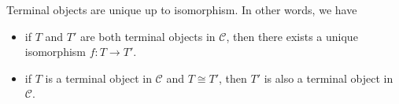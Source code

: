 \documentclass[12pt,twoside,a4paper]{report}
\theoremstyle{definition}
\newtheorem*{definition*}{Definition}
\theoremstyle{definition}
\begin{document}
        Terminal objects are unique up to isomorphism. In other words, we have
        \begin{itemize}
            \item 
                if $T$ and $T'$ are both terminal objects in $\mathcal{C}$, then there exists a unique isomorphism $f : T \to T'$.
            \item
                if $T$ is a terminal object in $\mathcal{C}$ and $T \cong T'$, then $T'$ is also a terminal object in $\mathcal{C}$.
        \end{itemize}


        
\end{document}
